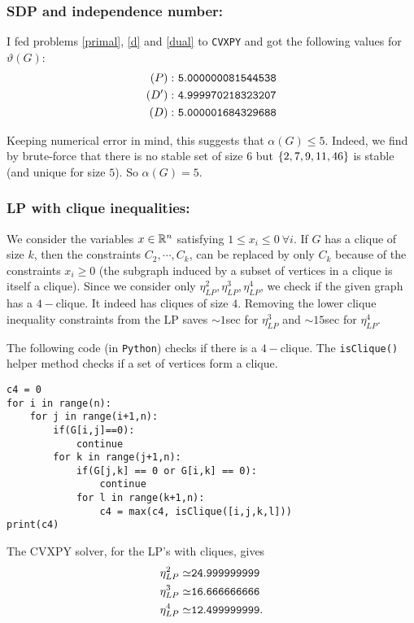 \begin{enumerate}[leftmargin=*]
\subsubsection*{SDP and independence number:}
I fed problems \ref{primal}, \ref{d} and \ref{dual} to \texttt{CVXPY} and got the following values for $\vartheta(G)$:
\begin{align*}
(P): &~\tt5.000000081544538 \\
(D'): &~\tt4.999970218323207 \\
(D): &~\tt5.000001684329688 
\end{align*}

Keeping numerical error in mind, this suggests that $\alpha(G)\le 5$. Indeed, we find by brute-force that there is no stable set of size $6$ but $\left\{2, 7, 9, 11, 46\right\}$ is stable (and unique for size $5$). So $\alpha(G) = 5$.

\subsubsection*{LP with clique inequalities:}
We consider the variables $x\in\mathbb{R}^{n}$ satisfying $1\le x_{i}\le 0~\forall i$. If $G$ has a clique of size $k$, then the constraints $C_{2},\cdots,C_{k}$, can be replaced by only $C_{k}$ because of the constraints $x_{i}\ge 0$ (the subgraph induced by a subset of vertices in a clique is itself a clique). Since we consider only $\eta_{LP}^{2}, \eta_{LP}^{3}, \eta_{LP}^{4}$, we check if the given graph has a $4-$clique. It indeed has cliques of size $4$. Removing the lower clique inequality constraints from the LP saves $\sim1$sec for $\eta_{LP}^{3}$ and $\sim15$sec for $\eta_{LP}^{4}$.

The following code (in \texttt{Python}) checks if there is a $4-$clique. The \texttt{isClique()} helper method checks if a set of vertices form a clique.
\begin{verbatim}
c4 = 0
for i in range(n):
    for j in range(i+1,n):
        if(G[i,j]==0):
            continue
        for k in range(j+1,n):
            if(G[j,k] == 0 or G[i,k] == 0):
                continue
            for l in range(k+1,n):
                c4 = max(c4, isClique([i,j,k,l]))
print(c4)
\end{verbatim}
The CVXPY solver, for the LP's with cliques, gives \begin{align*}
\eta_{LP}^{2} \simeq& \tt{24.999999999}\\
\eta_{LP}^{3} \simeq &\tt{16.666666666}\\
\eta_{LP}^{4} \simeq &\tt{12.499999999}.
\end{align*}


\end{enumerate}
